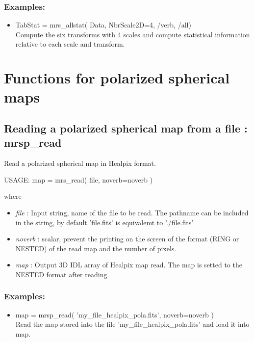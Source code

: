 \subsubsection*{Examples:} 
\begin{itemize}
\item TabStat = mrs\_allstat( Data, NbrScale2D=4, /verb, /all)  \\
Compute the six transforms with 4 scales and compute statistical information relative to each scale and transform.
\end{itemize}



\section{Functions for polarized spherical maps}

\subsection{Reading a polarized spherical map from a file : mrsp\_read}
Read a polarized spherical map in Healpix format.
{\bf
\begin{center}
     USAGE: map = mrs\_read( file, noverb=noverb )
\end{center}}
where
\begin{itemize}
\item {\em file} : Input string, name of the file to be read. The pathname can be included in the string, by default 'file.fits' is equivalemt to './file.fits'
\item {\em noverb} : scalar, prevent the printing on the screen of the format (RING or NESTED) of the read map and the number of pixels.
\item {\em map} : Output 3D IDL array of Healpix map read. The map is setted to the NESTED format after reading.
\end{itemize}

\subsubsection*{Examples:} 
\begin{itemize}
\item map = mrsp\_read( 'my\_file\_healpix\_pola.fits', noverb=noverb ) \\
Read the map stored into the file 'my\_file\_healpix\_pola.fits' and load it into map.
\end{itemize}



